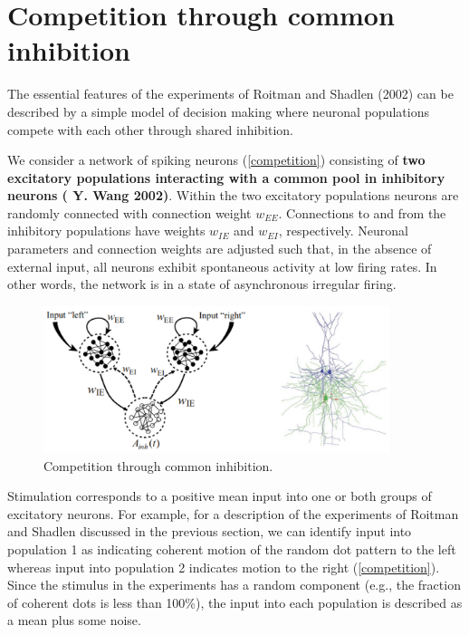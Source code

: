 \documentclass[12pt,hyperref,a4paper,UTF8]{ctexart}
\begin{document}
\section{Competition through common inhibition}

The essential features of the experiments of Roitman and Shadlen (2002) can be described by a simple model of decision making where neuronal populations compete with each other through shared inhibition.

We consider a network of spiking neurons (\autoref{competition}) consisting of \textbf{two excitatory populations interacting with a common pool in inhibitory neurons (\cite{Y. Wang 2002} Y. Wang 2002)}. Within the two excitatory populations neurons are randomly connected with connection weight $w_{EE}$. Connections to and from the inhibitory populations have weights $w_{IE}$ and $w_{EI}$, respectively. Neuronal parameters and connection weights are adjusted such that, in the absence of external input, all neurons exhibit spontaneous activity at low firing rates. In other words, the network is in a state of asynchronous irregular firing.


\begin{figure}[h]
    \begin{center}
    \includegraphics[width=0.9\textwidth]{competition1.png}
    \caption{Competition through common inhibition.}
    \label{competition}
    \end{center}
\end{figure}

\newpage
Stimulation corresponds to a positive mean input into one or both groups of excitatory neurons. For example, for a description of the experiments of Roitman and Shadlen discussed in the previous section, we can identify input into population 1 as indicating coherent motion of the random dot pattern to the left whereas input into population 2 indicates motion to the right (\autoref{competition}). Since the stimulus in the experiments has a random component (e.g., the fraction of coherent dots is less than 100\%), the input into each population is described as a mean plus some noise.
\end{document}
